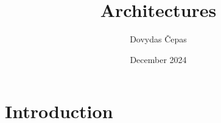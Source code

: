 \documentclass{article}
\title{Architectures}
\author{Dovydas Čepas}
\date{December 2024}
\begin{document}
\maketitle

\section{Introduction}
\end{document}
